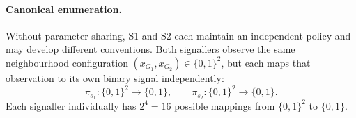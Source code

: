 \documentclass[a4paper,twoside,12pt]{report}
\begin{document}
    
    
    
    \paragraph{Canonical enumeration.}
    Without parameter sharing, S1 and S2 each maintain an independent policy and
    may develop different conventions. Both signallers observe the same neighbourhood
    configuration $(x_{G_1}, x_{G_2}) \in \{0,1\}^2$, but each maps that
    observation to its own binary signal independently:
    \begin{equation}
        \pi_{s_1} : \{0,1\}^2 \to \{0,1\}, \qquad
        \pi_{s_2} : \{0,1\}^2 \to \{0,1\}.
    \end{equation}
    Each signaller individually has $2^4 = 16$ possible mappings from
    $\{0,1\}^2$ to $\{0,1\}$. 
    
\end{document}

